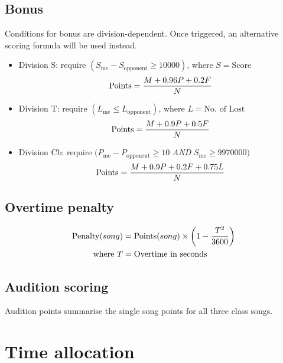 \documentclass{article}
\newcommand{\alert}[1]{{\color{red} #1}}
\newcommand{\penalyformula}[1]{{\color{cyan} #1}}
\begin{document}
\subsection{Bonus}

Conditions for bonus are division-dependent.
Once triggered, an alternative scoring formula
will be used instead.

\begin{itemize}
	\item Division S: require $(S_\text{me} - S_\text{opponent} \geq \num[group-separator={,}]{10000})$, where $S = \text{Score}$
	      \alert{
		      \begin{equation*}
			      \text{Points} = \frac{M + 0.96P + 0.2F}N
		      \end{equation*}
	      }

	\item Division T: require $(L_\text{me} \leq L_\text{opponent})$, where $L = \text{No.~of Lost}$
	      \alert{
		      \begin{equation*}
			      \text{Points} = \frac{M + 0.9P + 0.5F}N
		      \end{equation*}
	      }

	\item Division Cb: require $(P_\text{me} - P_\text{opponent} \geq 10$ \emph{AND} $S_\text{me} \geq \num[group-separator={,}]{9970000})$
	      \alert{
		      \begin{equation*}
			      \text{Points} = \frac{M + 0.9P + 0.2F + 0.75L}N
		      \end{equation*}
	      }
\end{itemize}

\subsection{Overtime penalty}
\penalyformula{
	\begin{align*}
		\text{Penalty}(song) & = \text{Points}(song) \times \left(1-\frac{{T}^2} {3600}\right) \\
		\text{where}~T       & = \text{Overtime in seconds}
	\end{align*}
}

\subsection{Audition scoring}

Audition points summarise the single song points
for all three class songs.

\section{Time allocation}
\end{document}
